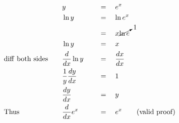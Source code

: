 \begin{alignat*}{5}
&\,&&y\quad&&\,=\quad e^x\\
&\,&&\ln{y}\quad&&\,=\quad\ln{e^x}\\
&\,&&\,\quad&&\,=\quad x\cancelto{1}{\ln{e}}\\
&\,&&\ln{y}\quad&&\,=\quad x\\
&\mathrm{diff~both~sides}\quad&&\frac{d}{dx}\ln{y}\quad&&\,=\quad \frac{dx}{dx}\\
&\,&&\frac{1}{y}\frac{dy}{dx}\quad&&\,=\quad1\\
&\,&&\frac{dy}{dx}\quad&&\,=\quad y\\
&\mathrm{Thus}\quad&&\frac{d}{dx}e^x\quad&&\,=\quad e^x&&\mathrm{(valid~proof)}
\end{alignat*}
